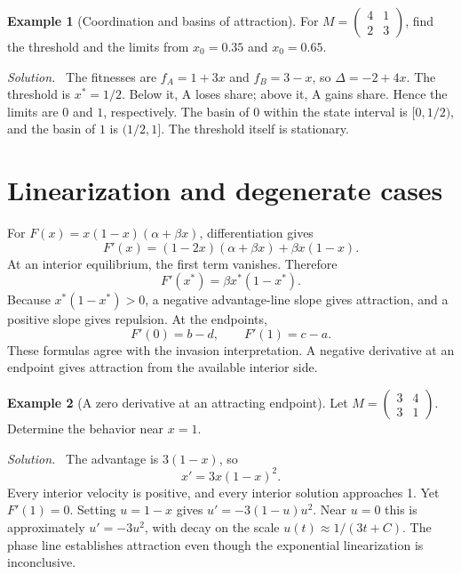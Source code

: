 \documentclass[11pt,oneside,openany]{book}
\theoremstyle{definition}
\newtheorem{example}{Example}[chapter]
\theoremstyle{remark}
\newenvironment{solution}{\par\smallskip\noindent\textit{Solution.}\ }{\par\smallskip}
\numberwithin{equation}{chapter}
\begin{document}
\begin{example}[Coordination and basins of attraction]
For $M=\left(\begin{smallmatrix}4&1\\2&3\end{smallmatrix}\right)$, find the threshold and the limits from $x_0=0.35$ and $x_0=0.65$.
\begin{solution}
The fitnesses are $f_A=1+3x$ and $f_B=3-x$, so $\Delta=-2+4x$. The threshold is $x^*=1/2$. Below it, A loses share; above it, A gains share. Hence the limits are $0$ and $1$, respectively. The basin of $0$ within the state interval is $[0,1/2)$, and the basin of $1$ is $(1/2,1]$. The threshold itself is stationary.
\end{solution}
\end{example}

\section{Linearization and degenerate cases}
For $F(x)=x(1-x)(\alpha+\beta x)$, differentiation gives
\[
F'(x)=(1-2x)(\alpha+\beta x)+\beta x(1-x).
\]
At an interior equilibrium, the first term vanishes. Therefore
\begin{equation}\label{eq:matrixlinear}
F'(x^*)=\beta x^*(1-x^*).
\end{equation}
Because $x^*(1-x^*)>0$, a negative advantage-line slope gives attraction, and a positive slope gives repulsion. At the endpoints,
\[
F'(0)=b-d,\qquad F'(1)=c-a.
\]
These formulas agree with the invasion interpretation. A negative derivative at an endpoint gives attraction from the available interior side.

\begin{example}[A zero derivative at an attracting endpoint]
Let $M=\left(\begin{smallmatrix}3&4\\3&1\end{smallmatrix}\right)$. Determine the behavior near $x=1$.
\begin{solution}
The advantage is $3(1-x)$, so
\[
x'=3x(1-x)^2.
\]
Every interior velocity is positive, and every interior solution approaches 1. Yet $F'(1)=0$. Setting $u=1-x$ gives $u'=-3(1-u)u^2$. Near $u=0$ this is approximately $u'=-3u^2$, with decay on the scale $u(t)\approx1/(3t+C)$. The phase line establishes attraction even though the exponential linearization is inconclusive.
\end{solution}
\end{example}
\end{document}
